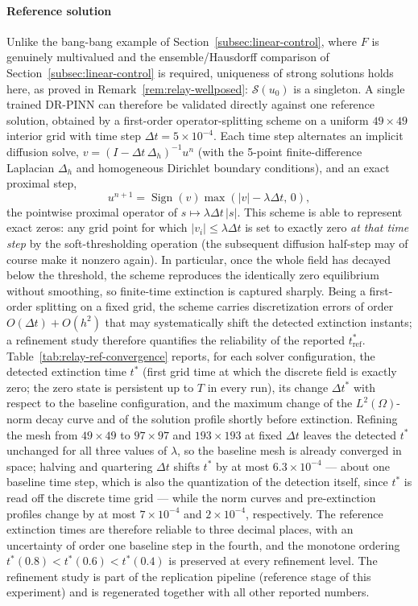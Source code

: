 \documentclass[11pt]{elsarticle}
\theoremstyle{definition}
\theoremstyle{remark}
\numberwithin{equation}{section}
\DeclareMathOperator{\Sign}{Sign}
\begin{document}
\paragraph{Reference solution}
Unlike the bang-bang example of Section~\ref{subsec:linear-control}, where
$F$ is genuinely multivalued and the ensemble/Hausdorff comparison of
Section~\ref{subsec:linear-control} is required, uniqueness of strong
solutions holds here, as proved in Remark~\ref{rem:relay-wellposed}:
$\mathcal{S}(u_0)$ is a singleton. A single trained
DR-PINN can therefore be validated directly against one reference solution,
obtained by a first-order operator-splitting scheme on a uniform
$49\times49$ interior grid with time step $\Delta t=5\times10^{-4}$.
Each time step alternates an implicit diffusion solve,
$v=(I-\Delta t\,\Delta_h)^{-1}u^n$ (with the 5-point finite-difference
Laplacian $\Delta_h$ and homogeneous Dirichlet boundary conditions), and an
exact proximal step,
\[
u^{n+1}=\Sign(v)\max(|v|-\lambda\Delta t,\,0),
\]
the pointwise proximal operator of $s\mapsto\lambda\Delta t\,|s|$.
This scheme is able to represent exact zeros: any grid point for which
$|v_i|\le\lambda\Delta t$ is set to exactly zero \emph{at that time
step} by the soft-thresholding operation (the subsequent diffusion
half-step may of course make it nonzero again). In particular, once the
whole field has decayed below the threshold, the scheme reproduces the
identically zero equilibrium without smoothing, so finite-time extinction
is captured sharply. Being a first-order splitting on a fixed grid, the
scheme carries discretization errors of order $O(\Delta t)+O(h^2)$ that
may systematically shift the detected extinction instants; a refinement
study therefore quantifies the reliability of the reported
$t^*_{\mathrm{ref}}$. Table~\ref{tab:relay-ref-convergence} reports, for
each solver configuration, the detected extinction time $t^*$ (first grid
time at which the discrete field is exactly zero; the zero state is
persistent up to $T$ in every run), its change $\Delta t^*$ with respect
to the baseline configuration, and the maximum change of the
$L^2(\Omega)$-norm decay curve and of the solution profile shortly before
extinction. Refining the mesh from $49\times49$ to $97\times97$ and
$193\times193$ at fixed $\Delta t$ leaves the detected $t^*$ unchanged
for all three values of $\lambda$, so the baseline mesh is already
converged in space; halving and quartering $\Delta t$ shifts $t^*$ by at
most $6.3\times10^{-4}$ --- about one baseline time step, which is also
the quantization of the detection itself, since $t^*$ is read off the
discrete time grid --- while the norm curves and pre-extinction profiles
change by at most $7\times10^{-4}$ and $2\times10^{-4}$, respectively.
The reference extinction times are therefore reliable to three decimal
places, with an uncertainty of order one baseline step in the fourth, and
the monotone ordering $t^*(0.8)<t^*(0.6)<t^*(0.4)$ is preserved at every
refinement level. The refinement study is part of the replication
pipeline (reference stage of this experiment) and is regenerated together
with all other reported numbers.
\end{document}
